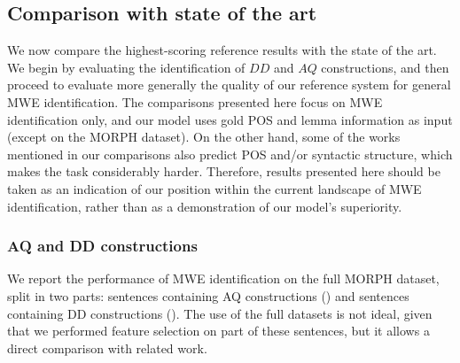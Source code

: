 \documentclass[output=paper,
modfonts
]{langscibook}
\begin{document}
\begin{comment}
FTB-test & 84.03 & 74.71 & 79.10 & 86.72 & 78.47 & 82.39 \\ \hline
\end{tabular}
\caption{Second features selection on FTB-dev with all MWEs}
\label{tab:ftbAllMWEsFine}
\end{table*}

The first important remark is that the results do not vary as much as the case of nominal MWEs, which is logical since the AMs are measures applied on nominal MWEs only. But we remark a similar behaviour that in tests on nominal MWEs. Moreover, the only tests that increase the results are when we remove the dice measure, and when we remove the t measure. Our BEST configuration will be the configuration without the t measure, since when we tried to remove dice and t in the same time, the results decrease. 

Then, we applied the features group BEST to FTB-test, and we obtain a MWE-based F$_1$ score of 79.10\%, and a Token-based score of 82.39\%. 
\end{comment}



\subsection{Comparison with state of the art}
\label{subsec:compare}

We now compare the highest-scoring reference results with the state of the art. We begin by evaluating the identification of $DD$ and $AQ$ constructions, and then proceed to evaluate more generally the quality of our reference system for general MWE identification. The comparisons presented here focus on MWE identification only, and our model uses gold POS and lemma information as input (except on the MORPH dataset). On the other hand, some of the works mentioned in our comparisons also predict POS and/or syntactic structure, which makes the task considerably harder. Therefore, results presented here should be taken as an indication of our position within the current landscape of MWE identification, rather than as a demonstration of our model's superiority.


\subsubsection{AQ and DD constructions}

We report the performance of MWE identification on the full MORPH dataset, split in two parts: sentences containing AQ constructions (\fullAQ) and sentences containing DD constructions (\fullDD). The use of the full datasets is not ideal, given that we performed feature selection on part of these sentences, but it allows a direct comparison with related work. 
\end{document}
